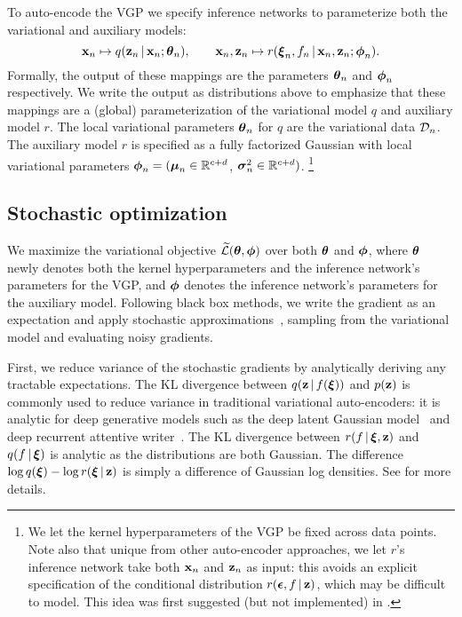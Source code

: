 To auto-encode the \gls{VGP} we specify inference networks to
parameterize both the variational and auxiliary models:
\begin{equation*}
\boldsymbol{\mathbf{x}}_n\mapsto q(\boldsymbol{\mathbf{z}}_n\,|\,\boldsymbol{\mathbf{x}}_n; \boldsymbol{\mathbf{\theta}}_n),
\qquad
\boldsymbol{\mathbf{x}}_n,\boldsymbol{\mathbf{z}}_n\mapsto r(\boldsymbol{\mathbf{\xi}}_n,f_n\,|\,\boldsymbol{\mathbf{x}}_n,\boldsymbol{\mathbf{z}}_n;
\boldsymbol{\mathbf{\phi}}_n).
\end{equation*}
Formally, the output of these mappings are the parameters $\boldsymbol{\mathbf{\theta}}_n$ and
$\boldsymbol{\mathbf{\phi}}_n$ respectively. We write the output as distributions above to emphasize
that these mappings are a (global) parameterization of the variational
model $q$ and auxiliary model $r$.
The local variational parameters $\boldsymbol{\mathbf{\theta}}_n$ for $q$ are the
variational data $\mathcal{D}_n$. The auxiliary model $r$ is specified as a fully factorized
Gaussian with local variational parameters
$\boldsymbol{\mathbf{\phi}}_n=(\boldsymbol{\mathbf{\mu}}_n\in\mathbb{R}^{c+d}$,
$\boldsymbol{\mathbf{\sigma}}^2_n\in\mathbb{R}^{c+d})$.  \footnote{We let the kernel
hyperparameters of the \gls{VGP} be fixed across data points.
Note also that unique from other auto-encoder approaches, we let $r$'s
inference network take both $\boldsymbol{\mathbf{x}}_n$ and $\boldsymbol{\mathbf{z}}_n$ as input: this
avoids an explicit specification of the conditional distribution
$r(\boldsymbol{\mathbf{\epsilon}},f\,|\,\boldsymbol{\mathbf{z}})$, which may be difficult to model.
This idea was first suggested (but not implemented) in
\citet{ranganath2015hierarchical}.
}

\subsection{Stochastic optimization}
\label{sec:bbi:gradient}

We maximize the variational objective
$\widetilde{\mathcal{L}}(\boldsymbol{\mathbf{\theta}},\boldsymbol{\mathbf{\phi}})$ over both $\boldsymbol{\mathbf{\theta}}$ and $\boldsymbol{\mathbf{\phi}}$, where
$\boldsymbol{\mathbf{\theta}}$ newly denotes both the kernel hyperparameters and
the inference network's parameters for the \gls{VGP}, and $\boldsymbol{\mathbf{\phi}}$
denotes the
inference network's parameters for the auxiliary model.
Following black box methods, we write
the gradient as an expectation and apply stochastic
approximations~\citep{robbins1951stochastic}, sampling from the
variational model and evaluating noisy gradients.

First, we reduce variance of the stochastic gradients by analytically
deriving any tractable expectations.
The KL divergence between
$q(\boldsymbol{\mathbf{z}}\,|\, f(\boldsymbol{\mathbf{\xi}}))$ and $p(\boldsymbol{\mathbf{z}})$ is commonly used to reduce
variance in traditional variational auto-encoders: it is analytic for
deep generative models such as the deep latent Gaussian
model~\citep{rezende2014stochastic} and deep recurrent
attentive writer~\citep{gregor2015draw}.
The KL divergence between
$r(f\,|\,\boldsymbol{\mathbf{\xi}},\boldsymbol{\mathbf{z}})$ and $q(f\,|\,\boldsymbol{\mathbf{\xi}})$ is analytic as the distributions
are both Gaussian. The difference $\log q(\boldsymbol{\mathbf{\xi}}) - \log
r(\boldsymbol{\mathbf{\xi}}\,|\,\boldsymbol{\mathbf{z}})$ is simply a difference of Gaussian log densities.
See  for more details.

